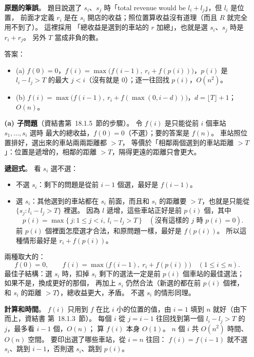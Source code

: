 \begin{pastsoln}
\textbf{原題的筆誤}。 題目說選了 $s_i$、$s_j$ 時「total revenue would be $l_i + l_j$」，但 $l_i$ 是位置，
前面才定義 $r_i$ 是在 $s_i$ 開店的收益；照位置算收益沒有道理（而且 $R$ 就完全用不到了）。 這裡採用
「總收益是選到的車站的 $r$ 加總」，也就是選 $s_i$、$s_j$ 時是 $r_i + r_j$。 另外 $T$ 當成非負的數。

答案：
\begin{itemize}
\item (a) $f(0) = 0$，$f(i) = \max\bigl(f(i-1),\ r_i + f(p(i))\bigr)$，$p(i)$ 是 $l_i - l_j > T$ 的最大
$j < i$（沒有就是 $0$）；逐一往回找 $p(i)$，$O(n^2)$。
\item (b) $f(i) = \max\bigl(f(i-1),\ r_i + f(\max(0, i - d))\bigr)$，$d = \lfloor T \rfloor + 1$；$O(n)$。
\end{itemize}

\textbf{(a) 子問題}（資結書第~18.1.5~節的步驟）。 令 $f(i)$ 是只能從前 $i$ 個車站 $s_1, \ldots, s_i$ 選時
最大的總收益，$f(0) = 0$（不選）；要的答案是 $f(n)$。 車站照位置排好，選出來的車站兩兩距離都 $> T$，
等價於「相鄰兩個選到的車站距離 $> T$」：位置是遞增的，相鄰的距離 $> T$，隔得更遠的距離只會更大。

\textbf{遞迴式}。 看 $s_i$ 選不選：
\begin{itemize}
\item 不選 $s_i$：剩下的問題是從前 $i - 1$ 個選，最好是 $f(i - 1)$。
\item 選 $s_i$：其他選到的車站都在 $s_i$ 前面，而且和 $s_i$ 的距離要 $> T$，也就是只能從
$\{s_j : l_i - l_j > T\}$ 裡選。 因為 $l$ 遞增，這些車站正好是前 $p(i)$ 個，其中
\[
p(i) = \max\{\, j : 1 \le j < i,\ l_i - l_j > T \,\} \quad (\text{沒有這樣的 } j \text{ 時 } p(i) = 0).
\]
前 $p(i)$ 個裡面怎麼選才合法，和原問題一樣，最好是 $f(p(i))$。 所以這種情形最好是 $r_i + f(p(i))$。
\end{itemize}
兩種取大的：
\[
f(0) = 0, \qquad f(i) = \max\bigl(f(i - 1),\ r_i + f(p(i))\bigr) \quad (1 \le i \le n).
\]
最佳子結構：選 $s_i$ 時，扣掉 $s_i$ 剩下的選法一定是前 $p(i)$ 個車站的最佳選法；如果不是，換成更好的那個，
再加上 $s_i$ 仍然合法（新選的都在前 $p(i)$ 個裡，和 $s_i$ 的距離 $> T$），總收益更大，矛盾。 不選 $s_i$
的情形同理。

\textbf{計算和時間}。 $f(i)$ 只用到 $f$ 在比 $i$ 小的位置的值，由 $i = 1$ 填到 $n$ 就好（由下而上，資結書
第~18.1.3~節）。 每個 $i$ 從 $j = i - 1$ 往回找到第一個 $l_i - l_j > T$ 的 $j$，最多看 $i - 1$ 個，$O(n)$；
算 $f(i)$ 本身 $O(1)$。 $n$ 個 $i$ 共 $O(n^2)$ 時間、$O(n)$ 空間。 要印出選了哪些車站，從 $i = n$ 往回：
$f(i) = f(i - 1)$ 就不選 $s_i$、跳到 $i - 1$，否則選 $s_i$、跳到 $p(i)$。


\end{pastsoln}
